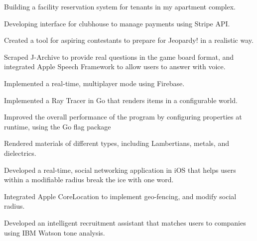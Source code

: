 \documentclass[]{deedy-resume-openfont}
\begin{document}
\begin{minipage}[t]{0.66\textwidth}
\begin{tightemize}
\item Building a facility reservation system for tenants in my apartment complex.
\item Developing interface for clubhouse to manage payments using Stripe API.
\end{tightemize}
\sectionsep


\begin{tightemize}
\item Created a tool for aspiring contestants to prepare for Jeopardy! in a realistic way.
\item Scraped J-Archive to provide real questions in the game board format, and integrated Apple Speech Framework to allow users to answer with voice.
\item Implemented a real-time, multiplayer mode using Firebase.
\end{tightemize}
\sectionsep

\begin{tightemize}
\item Implemented a Ray Tracer in Go that renders items in a configurable world.
\item Improved the overall performance of the program by configuring properties at runtime, using the Go flag package
\item Rendered materials of different types, including Lambertians, metals, and dielectrics.
\end{tightemize}
\sectionsep

\begin{tightemize}
\item Developed a real-time, social networking application in iOS that helps users within a modifiable radius break the ice with one word.
\item Integrated Apple CoreLocation to implement geo-fencing, and modify social radius.
\end{tightemize}

\sectionsep

\begin{tightemize}
\item Developed an intelligent recruitment assistant that matches users to companies using IBM Watson tone analysis.

\end{tightemize}
\sectionsep


\end{minipage}
\end{document}
